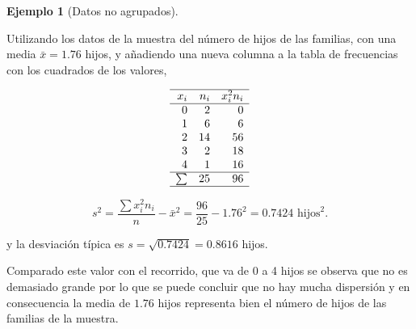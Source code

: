 \documentclass[
  spanish,
  a4paper,
]{scrreport}
\theoremstyle{plain}
\theoremstyle{definition}
\newtheorem{example}{Ejemplo}[chapter]
\theoremstyle{definition}
\theoremstyle{remark}
\begin{document}
\begin{example}[Datos no
agrupados]\protect\hypertarget{exm-desviacion-tipica-datos-no-agrupados}{}\label{exm-desviacion-tipica-datos-no-agrupados}

Utilizando los datos de la muestra del número de hijos de las familias,
con una media \(\bar x=1.76\) hijos, y añadiendo una nueva columna a la
tabla de frecuencias con los cuadrados de los valores,

\[
\begin{array}{rrr}
\hline
x_i & n_i & x_i^2n_i \\
\hline
0 & 2 & 0 \\
1 & 6 & 6 \\
2 & 14 & 56\\
3 & 2  & 18\\
4 & 1 & 16 \\
\hline
\sum & 25 & 96 \\
\hline
\end{array}\]

\[s^2 = \frac{\sum x_i^2n_i}{n}-\bar x^2 = \frac{96}{25}-1.76^2= 0.7424 \mbox{ hijos}^2.\]

y la desviación típica es \(s=\sqrt{0.7424} = 0.8616\) hijos.

Comparado este valor con el recorrido, que va de 0 a 4 hijos se observa
que no es demasiado grande por lo que se puede concluir que no hay mucha
dispersión y en consecuencia la media de \(1.76\) hijos representa bien
el número de hijos de las familias de la muestra.

\end{example}
\end{document}
